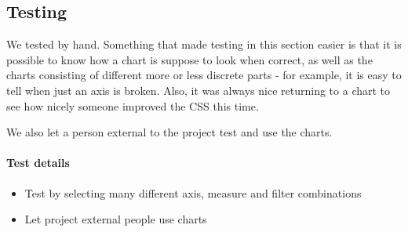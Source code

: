 \subsection{Testing}
 We tested by hand. Something that made testing in this section easier is that it is possible to know
 how a chart is suppose to look when correct, as well as the charts consisting of different more or less discrete
 parts - for example, it is easy to tell when just an axis is broken.
 Also, it was always nice returning to a chart to see how nicely someone improved the CSS this time. 
 
 We also let a person external to the project test and use the charts.

\paragraph{Test details}
\begin{itemize}
  \item Test by selecting many different axis, measure and filter combinations
  \item Let project external people use charts
\end{itemize}

